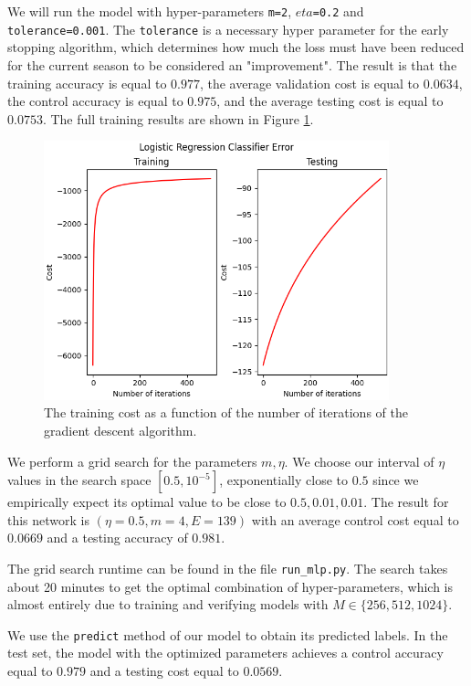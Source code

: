 \documentclass{article}
\newcommand{\code}{\texttt}
\begin{document}
We will run the model with hyper-parameters \code{m=2}, \code{$eta$=0.2} and \code{tolerance=0.001}. The \code{tolerance} is a necessary hyper parameter for the early stopping algorithm, which determines how much the loss must have been reduced for the current season to be considered an "improvement". The result is that the training accuracy is equal to $0.977$, the average validation cost is equal to $0.0634$, the control accuracy is equal to $0.975$, and the average testing cost is equal to $0.0753$. The full training results are shown in Figure \ref{mlp_train_test}.

\begin{figure}
	\includegraphics[width=10cm]{mlp_error.png}
	\centering
	\caption{The training cost as a function of the number of iterations of the gradient descent algorithm.}
	\label{mlp_train_test}
\end{figure}

We perform a grid search for the parameters $m, \eta$. We choose our interval of $\eta$ values in the search space $[0.5, 10^{-5}]$, exponentially close to $0.5$ since we empirically expect its optimal value to be close to $0.5, 0.01, 0.01$. The result for this network is $(\eta=0.5, m=4, E=139)$ with an average control cost equal to $0.0669$ and a testing accuracy of $0.981$.

The grid search runtime can be found in the file \code{run\_mlp.py}. The search takes about 20 minutes to get the optimal combination of hyper-parameters, which is almost entirely due to training and verifying models with $M \in \{256, 512, 1024\}$. 

We use the \code{predict} method of our model to obtain its predicted labels. In the test set, the model with the optimized parameters achieves a control accuracy equal to $0.979$ and a testing cost equal to $0.0569$.
\end{document}
